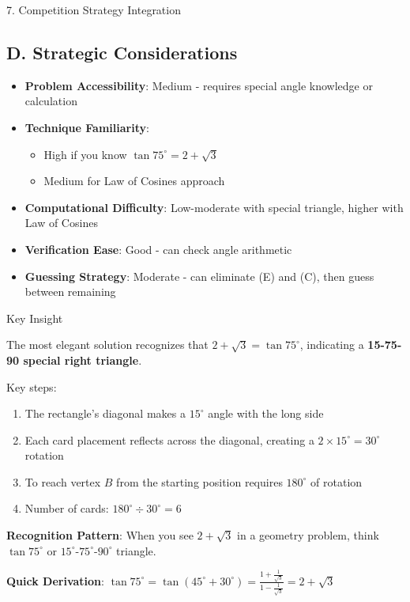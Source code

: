 \documentclass[12pt]{article}
\begin{document}
\begin{competitionbox}{7. Competition Strategy Integration}
\subsection*{D. Strategic Considerations}
\begin{itemize}[leftmargin=*]
    \item \textbf{Problem Accessibility}: Medium - requires special angle knowledge or calculation
    \item \textbf{Technique Familiarity}: 
    \begin{itemize}
        \item High if you know $\tan 75^\circ = 2+\sqrt{3}$
        \item Medium for Law of Cosines approach
    \end{itemize}
    \item \textbf{Computational Difficulty}: Low-moderate with special triangle, higher with Law of Cosines
    \item \textbf{Verification Ease}: Good - can check angle arithmetic
    \item \textbf{Guessing Strategy}: Moderate - can eliminate (E) and (C), then guess between remaining
\end{itemize}

\end{competitionbox}

\begin{highlightbox}{Key Insight}

The most elegant solution recognizes that $2+\sqrt{3} = \tan 75^\circ$, indicating a \textbf{15-75-90 special right triangle}.

Key steps:
\begin{enumerate}
    \item The rectangle's diagonal makes a $15^\circ$ angle with the long side
    \item Each card placement reflects across the diagonal, creating a $2 \times 15^\circ = 30^\circ$ rotation
    \item To reach vertex $B$ from the starting position requires $180^\circ$ of rotation
    \item Number of cards: $180^\circ \div 30^\circ = 6$
\end{enumerate}

\vspace{0.5em}
\noindent\textbf{Recognition Pattern}: When you see $2+\sqrt{3}$ in a geometry problem, think $\tan 75^\circ$ or $15^\circ$-$75^\circ$-$90^\circ$ triangle.

\vspace{0.5em}
\noindent\textbf{Quick Derivation}: $\tan 75^\circ = \tan(45^\circ+30^\circ) = \frac{1 + \frac{1}{\sqrt{3}}}{1 - \frac{1}{\sqrt{3}}} = 2+\sqrt{3}$

\end{highlightbox}
\end{document}
